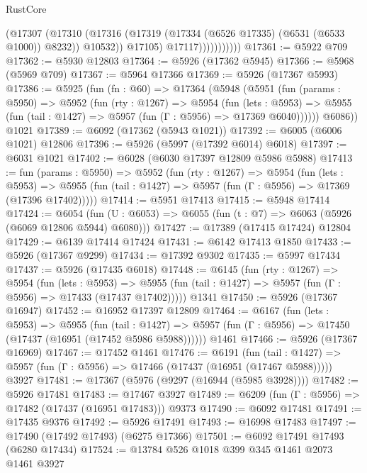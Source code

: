 \begin{lexlean}{RustCore}
\begin{coremodule}
                          (@17307
                            (@17310
                              (@17316
                                (@17319 (@17334 (@6526 @17335) (@6531 (@6533 @1000)) @8232))
                                @10532))
                            @17105)
                          @17117)))))))))))
@17361 := @5922 @709
@17362 := @5930 @12803
@17364 := @5926 (@17362 @5945)
@17366 := @5968 (@5969 @709)
@17367 := @5964 @17366
@17369 := @5926 (@17367 @5993)
@17386 := @5925
    (fun (fn : @60) =>
    @17364
      (@5948
        (@5951
          (fun (params : @5950) =>
          @5952
            (fun (rty : @1267) =>
            @5954
              (fun (lets : @5953) =>
              @5955 (fun (tail : @1427) => @5957 (fun (Γ : @5956) => @17369 @6040))))))
        @6086))
    @1021
@17389 := @6092 (@17362 (@5943 @1021))
@17392 := @6005 (@6006 @1021) @12806
@17396 := @5926 (@5997 (@17392 @6014) @6018)
@17397 := @6031 @1021
@17402 := @6028 (@6030 @17397 @12809 @5986 @5988)
@17413 := fun (params : @5950) =>
  @5952
    (fun (rty : @1267) =>
    @5954
      (fun (lets : @5953) =>
      @5955 (fun (tail : @1427) => @5957 (fun (Γ : @5956) => @17369 (@17396 @17402)))))
@17414 := @5951 @17413
@17415 := @5948 @17414
@17424 := @6054
    (fun (U : @6053) => @6055 (fun (t : @7) => @6063 (@5926 (@6069 @12806 @5944) @6080)))
@17427 := @17389 (@17415 @17424) @12804
@17429 := @6139 @17414 @17424
@17431 := @6142 @17413 @1850
@17433 := @5926 (@17367 @9299)
@17434 := @17392 @9302
@17435 := @5997 @17434
@17437 := @5926 (@17435 @6018)
@17448 := @6145
    (fun (rty : @1267) =>
    @5954
      (fun (lets : @5953) =>
      @5955 (fun (tail : @1427) => @5957 (fun (Γ : @5956) => @17433 (@17437 @17402)))))
    @1341
@17450 := @5926 (@17367 @16947)
@17452 := @16952 @17397 @12809
@17464 := @6167
    (fun (lets : @5953) =>
    @5955
      (fun (tail : @1427) =>
      @5957 (fun (Γ : @5956) => @17450 (@17437 (@16951 (@17452 @5986 @5988))))))
    @1461
@17466 := @5926 (@17367 @16969)
@17467 := @17452 @1461
@17476 := @6191
    (fun (tail : @1427) => @5957 (fun (Γ : @5956) => @17466 (@17437 (@16951 (@17467 @5988)))))
    @3927
@17481 := @17367 (@5976 (@9297 (@16944 (@5985 @3928))))
@17482 := @5926 @17481
@17483 := @17467 @3927
@17489 := @6209 (fun (Γ : @5956) => @17482 (@17437 (@16951 @17483))) @9373
@17490 := @6092 @17481
@17491 := @17435 @9376
@17492 := @5926 @17491
@17493 := @16998 @17483
@17497 := @17490 (@17492 @17493) (@6275 @17366)
@17501 := @6092 @17491 @17493 (@6280 @17434)
@17524 := @13784
    @526
    @1018
    @399
    @345
    @1461
    @2073
    @1461
    @3927

\end{coremodule}
\end{lexlean}
